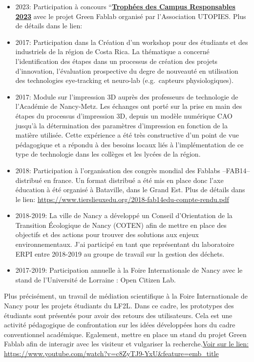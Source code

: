 \documentclass[
  11pt,
]{article}
\begin{document}
\begin{itemize}
\item
  2023: Participation à concours
  ``\href{https://utopies.com/trophees-des-campus-responsables/?utm_source=Campus+PROSPECT\&utm_campaign=6b68a37c92-EMAIL_CAMPAIGN_2018_04_18_COPY_01\&utm_medium=email\&utm_term=0_166f0fc31c-6b68a37c92-572807294}{\textbf{Trophées
  des Campus Responsables 2023}} avec le projet Green Fablab organisé
  par l'Association UTOPIES. Plus de détails dans le lien:
\item
  2017: Participation dans la Création d'un workshop pour des étudiants
  et des industriels de la région de Costa Rica. La thématique a
  concerné l'identification des étapes dans un processus de création des
  projets d'innovation, l'évaluation prospective du degre de nouveauté
  en utilisation des technologies eye-tracking et neuro-lab
  (e.g.~capteurs physiologiques).
\item
  2017: Module sur l'impression 3D auprès des professeurs de technologie
  de l'Académie de Nancy-Metz. Les échanges ont porté sur la prise en
  main des étapes du processus d'impression 3D, depuis un modèle
  numérique CAO jusqu'à la détermination des paramètres d'impression en
  fonction de la matière utilisée. Cette expérience a été très
  constructive d'un point de vue pédagogique et a répondu à des besoins
  locaux liés à l'implémentation de ce type de technologie dans les
  collèges et les lycées de la région.
\item
  2018: Participation à l'organisation des congrès mondial des Fablabs
  --FAB14-- distribué en france. Un format distribué a été mis en place
  donc l'axe éducation à été organisé à Bataville, dans le Grand Est.
  Plus de détails dans le lien:
  \url{https://www.tierslieuxedu.org/2018-fab14edu-compte-rendu.pdf}
\item
  2018-2019: La ville de Nancy a développé un Conseil d'Orientation de
  la Transition Écologique de Nancy (COTEN) afin de mettre en place des
  objectifs et des actions pour trouver des solutions aux enjeux
  environnementaux. J'ai participé en tant que représentant du
  laboratoire ERPI entre 2018-2019 au groupe de travail sur la gestion
  des déchets.
\item
  2017-2019: Participation annuelle à la Foire Internationale de Nancy
  avec le stand de l'Université de Lorraine : Open Citizen Lab.
\end{itemize}

Plus précisément, un travail de médiation scientifique à la Foire
Internationale de Nancy pour les projets étudiants du LF2L. Dans ce
cadre, les prototypes des étudiants sont présentés pour avoir des
retours des utilisateurs. Cela est une activité pédagogique de
confrontation sur les idées développées hors du cadre conventionnel
académique. Egalement, mettre en place un stand du projet Green Fablab
afin de interagir avec les visiteur et vulgariser la
recherche.\href{https://www.youtube.com/watch?v=c8ZyTJ9-YxU\&feature=emb_title}{Voir
sur le lien:
https://www.youtube.com/watch?v=c8ZyTJ9-YxU\&feature=emb\_title}
\end{document}
